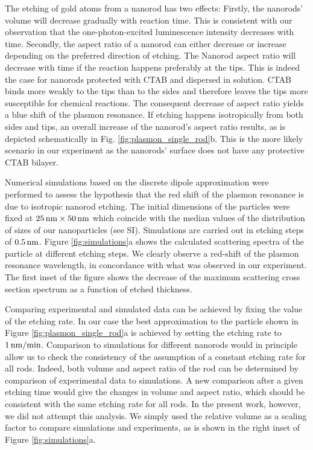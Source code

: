 The etching of gold atoms from a nanorod has two effects: Firstly, the nanorods'
volume will decrease gradually with reaction time. This is consistent with our
observation that the one-photon-excited luminescence intensity decreases with
time. Secondly, the aspect ratio of a nanorod can either decrease or increase
depending on the preferred direction of etching. The Nanorod aspect ratio will
decrease with time if the reaction happens preferably at the tips. This is
indeed the case for nanorods protected with CTAB and dispersed in
solution\cite{Jana2002}. CTAB binds more weakly to the tips than to the
sides and therefore leaves the tips more susceptible for chemical
reactions\cite{Caswell2003}. The consequent decrease of aspect ratio yields a
blue shift of the plasmon resonance\cite{Link1999}. If etching
happens isotropically from both sides and tips, an overall increase
of the nanorod's aspect ratio results, as is depicted schematically in Fig.
\ref{fig:plasmon_single_rod}b. This is the more likely scenario in our
experiment as the nanorods' surface does not have any protective CTAB bilayer.

Numerical simulations based on the discrete dipole approximation were performed
to assess the hypothesis that the red shift of the plasmon resonance is 
due to isotropic nanorod etching. The initial dimensions of the
particles were fixed at $25\,\textrm{nm}\times50\,\textrm{nm}$ which coincide with the median values of the
distribution of sizes of our nanoparticles (see SI). Simulations are carried out
in etching steps of $0.5\,\textrm{nm}$. Figure \ref{fig:simulations}a shows the calculated
scattering spectra of the particle at different etching steps. We clearly
observe a red-shift of the plasmon resonance wavelength, in concordance with
what was observed in our experiment. The first inset of the figure shows the
decrease of the maximum scattering cross section spectrum as a function of
etched thickness. 

Comparing experimental and simulated data can be achieved by fixing the value of
the etching rate. In our case the best approximation to the particle shown in
Figure \ref{fig:plasmon_single_rod}a is achieved by setting the etching rate to
$1\,\textrm{nm}/\textrm{min}$. Comparison to simulations for different nanorods would in
principle allow us to check the consistency of the assumption of a constant
etching rate for all rods. Indeed, both volume and aspect ratio of the rod can
be determined by comparison of experimental data to simulations.
A new comparison after a given etching time would give the changes in volume and
aspect ratio, which should be consistent with the same etching rate for all
rods. In the present work, however, we did not attempt this analysis. We simply
used the relative volume as a scaling factor to compare simulations and
experiments, as is shown in the right inset of Figure \ref{fig:simulations}a.

